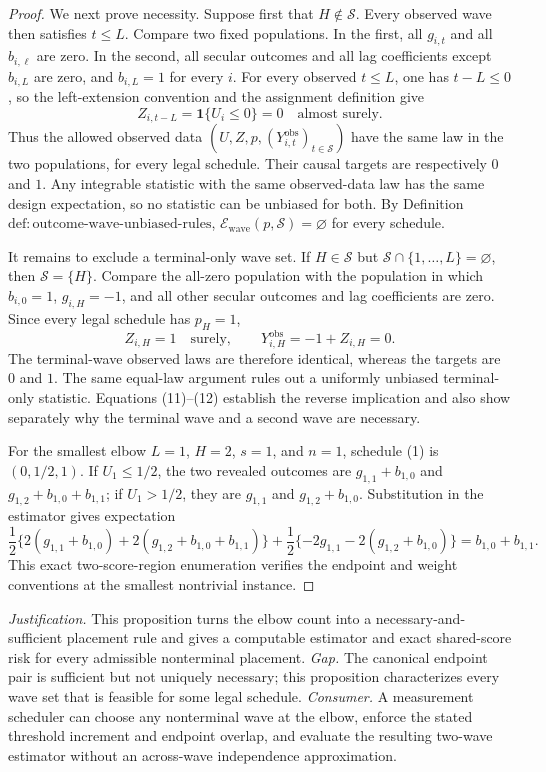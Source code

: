 \documentclass{article}
\begin{document}
\begin{proof}
We next prove necessity.  Suppose first that \(H\notin\mathcal S\).  Every observed wave then satisfies \(t\leq L\).  Compare two fixed populations.  In the first, all \(g_{i,t}\) and all \(b_{i,\ell}\) are zero.  In the second, all secular outcomes and all lag coefficients except \(b_{i,L}\) are zero, and \(b_{i,L}=1\) for every \(i\).  For every observed \(t\leq L\), one has \(t-L\leq0\), so the left-extension convention and the assignment definition give
\[
 Z_{i,t-L}=\mathbf 1\{U_i\leq0\}=0
 \quad\text{almost surely}.
\tag{11}
\]
Thus the allowed observed data \((U,Z,p,(Y^{\mathrm{obs}}_{i,t})_{t\in\mathcal S})\) have the same law in the two populations, for every legal schedule.  Their causal targets are respectively \(0\) and \(1\).  Any integrable statistic with the same observed-data law has the same design expectation, so no statistic can be unbiased for both.  By Definition \(\mathrm{def:outcome\text{-}wave\text{-}unbiased\text{-}rules}\), \(\mathcal E_{\mathrm{wave}}(p,\mathcal S)=\varnothing\) for every schedule.

It remains to exclude a terminal-only wave set.  If \(H\in\mathcal S\) but \(\mathcal S\cap\{1,\ldots,L\}=\varnothing\), then \(\mathcal S=\{H\}\).  Compare the all-zero population with the population in which \(b_{i,0}=1\), \(g_{i,H}=-1\), and all other secular outcomes and lag coefficients are zero.  Since every legal schedule has \(p_H=1\),
\[
 Z_{i,H}=1\quad\text{surely},
 \qquad
 Y^{\mathrm{obs}}_{i,H}=-1+Z_{i,H}=0.
\tag{12}
\]
The terminal-wave observed laws are therefore identical, whereas the targets are \(0\) and \(1\).  The same equal-law argument rules out a uniformly unbiased terminal-only statistic.  Equations (11)--(12) establish the reverse implication and also show separately why the terminal wave and a second wave are necessary.

For the smallest elbow \(L=1\), \(H=2\), \(s=1\), and \(n=1\), schedule (1) is \((0,1/2,1)\).  If \(U_1\leq1/2\), the two revealed outcomes are \(g_{1,1}+b_{1,0}\) and \(g_{1,2}+b_{1,0}+b_{1,1}\); if \(U_1>1/2\), they are \(g_{1,1}\) and \(g_{1,2}+b_{1,0}\).  Substitution in the estimator gives expectation
\[
 \frac12\{2(g_{1,1}+b_{1,0})+2(g_{1,2}+b_{1,0}+b_{1,1})\}
 +\frac12\{-2g_{1,1}-2(g_{1,2}+b_{1,0})\}
 =b_{1,0}+b_{1,1}.
\]
This exact two-score-region enumeration verifies the endpoint and weight conventions at the smallest nontrivial instance.
\end{proof}
\par\smallskip\noindent \textit{Justification.} This proposition turns the elbow count into a necessary-and-sufficient placement rule and gives a computable estimator and exact shared-score risk for every admissible nonterminal placement. \textit{Gap.} The canonical endpoint pair is sufficient but not uniquely necessary; this proposition characterizes every wave set that is feasible for some legal schedule. \textit{Consumer.} A measurement scheduler can choose any nonterminal wave at the elbow, enforce the stated threshold increment and endpoint overlap, and evaluate the resulting two-wave estimator without an across-wave independence approximation.
\end{document}
